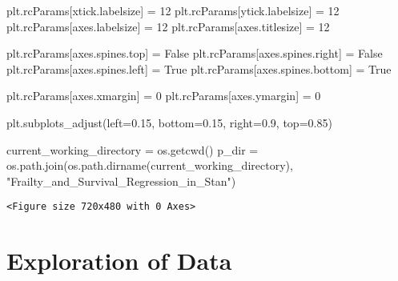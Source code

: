 \documentclass[
  letterpaper,
  DIV=11,
  numbers=noendperiod]{scrartcl}
\newenvironment{Shaded}{\begin{snugshade}}{\end{snugshade}}
\newcommand{\DecValTok}[1]{\textcolor[rgb]{0.68,0.00,0.00}{#1}}
\newcommand{\FloatTok}[1]{\textcolor[rgb]{0.68,0.00,0.00}{#1}}
\newcommand{\NormalTok}[1]{\textcolor[rgb]{0.00,0.23,0.31}{#1}}
\newcommand{\OperatorTok}[1]{\textcolor[rgb]{0.37,0.37,0.37}{#1}}
\newcommand{\StringTok}[1]{\textcolor[rgb]{0.13,0.47,0.30}{#1}}
\newcommand{\VariableTok}[1]{\textcolor[rgb]{0.07,0.07,0.07}{#1}}
\begin{document}
\begin{Shaded}
\begin{Highlighting}[]
\NormalTok{plt.rcParams[}\StringTok{\textquotesingle{}xtick.labelsize\textquotesingle{}}\NormalTok{] }\OperatorTok{=} \DecValTok{12}  
\NormalTok{plt.rcParams[}\StringTok{\textquotesingle{}ytick.labelsize\textquotesingle{}}\NormalTok{] }\OperatorTok{=} \DecValTok{12}  
\NormalTok{plt.rcParams[}\StringTok{\textquotesingle{}axes.labelsize\textquotesingle{}}\NormalTok{] }\OperatorTok{=} \DecValTok{12}  
\NormalTok{plt.rcParams[}\StringTok{\textquotesingle{}axes.titlesize\textquotesingle{}}\NormalTok{] }\OperatorTok{=} \DecValTok{12}   

\NormalTok{plt.rcParams[}\StringTok{\textquotesingle{}axes.spines.top\textquotesingle{}}\NormalTok{] }\OperatorTok{=} \VariableTok{False}
\NormalTok{plt.rcParams[}\StringTok{\textquotesingle{}axes.spines.right\textquotesingle{}}\NormalTok{] }\OperatorTok{=} \VariableTok{False}
\NormalTok{plt.rcParams[}\StringTok{\textquotesingle{}axes.spines.left\textquotesingle{}}\NormalTok{] }\OperatorTok{=} \VariableTok{True}
\NormalTok{plt.rcParams[}\StringTok{\textquotesingle{}axes.spines.bottom\textquotesingle{}}\NormalTok{] }\OperatorTok{=} \VariableTok{True}

\NormalTok{plt.rcParams[}\StringTok{\textquotesingle{}axes.xmargin\textquotesingle{}}\NormalTok{] }\OperatorTok{=} \DecValTok{0}  
\NormalTok{plt.rcParams[}\StringTok{\textquotesingle{}axes.ymargin\textquotesingle{}}\NormalTok{] }\OperatorTok{=} \DecValTok{0}  

\NormalTok{plt.subplots\_adjust(left}\OperatorTok{=}\FloatTok{0.15}\NormalTok{, bottom}\OperatorTok{=}\FloatTok{0.15}\NormalTok{, right}\OperatorTok{=}\FloatTok{0.9}\NormalTok{, top}\OperatorTok{=}\FloatTok{0.85}\NormalTok{)}

\NormalTok{current\_working\_directory }\OperatorTok{=}\NormalTok{ os.getcwd()}
\NormalTok{p\_dir }\OperatorTok{=}\NormalTok{ os.path.join(os.path.dirname(current\_working\_directory), }\StringTok{"Frailty\_and\_Survival\_Regression\_in\_Stan"}\NormalTok{)}
\end{Highlighting}
\end{Shaded}

\begin{verbatim}
<Figure size 720x480 with 0 Axes>
\end{verbatim}

\section{Exploration of Data}\label{exploration-of-data}
\end{document}
